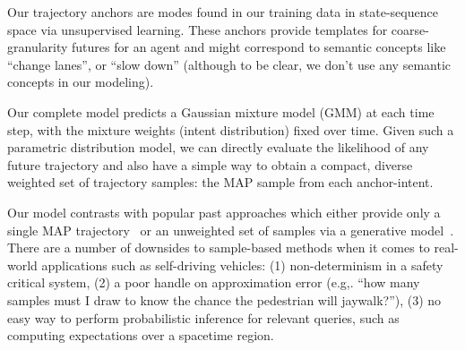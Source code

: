 \documentclass{article}
\newcommand{\out}[1]{}
\begin{document}
Our trajectory anchors are modes found in our training data in state-sequence space via unsupervised learning.  These anchors provide templates for coarse-granularity futures for an agent and might correspond to semantic concepts like ``change lanes'', or ``slow down'' (although to be clear, we don't use any semantic concepts in our modeling). 

Our complete model predicts a Gaussian mixture model (GMM) at each time step, with the mixture weights (intent distribution) fixed over time. Given such a parametric distribution model, we can directly evaluate the likelihood of any future trajectory and also have a simple way to obtain a compact, diverse weighted set of trajectory samples: the MAP sample from each anchor-intent.

\out{
In contrast to recent work predicting non-parametric occupancy grid distributions~\cite{Bansal19, Hong19}, it is a more compact description of the future by orders of magnitude.
}

Our model contrasts with popular past approaches which either provide only a single MAP trajectory~\cite{Luo18, Casas18, Sadeghian18, Pellegrini09, Bansal19} or an unweighted set of samples via a generative model~\cite{Lee17,  Rhinehart18, Hong19,  Ivanovic18, Bhattacharyya18BestOfMany, Kitani12, Ma17}.
There are a number of downsides to sample-based methods when it comes to real-world applications such as self-driving vehicles: (1) non-determinism in a safety critical system, (2) a poor handle on approximation error (e.g,. “how many samples must I draw to know the chance the pedestrian will jaywalk?”), (3) no easy way to perform probabilistic inference for relevant queries, such as computing expectations over a spacetime region.
\end{document}

